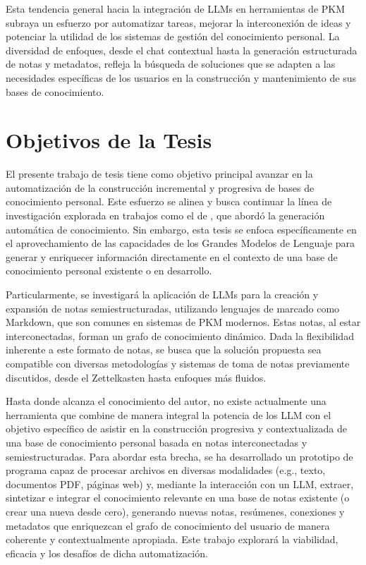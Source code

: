 Esta tendencia general hacia la integración de LLMs en herramientas de PKM subraya un esfuerzo por automatizar tareas, mejorar la interconexión de ideas y potenciar la utilidad de los sistemas de gestión del conocimiento personal. La diversidad de enfoques, desde el chat contextual hasta la generación estructurada de notas y metadatos, refleja la búsqueda de soluciones que se adapten a las necesidades específicas de los usuarios en la construcción y mantenimiento de sus bases de conocimiento.

\section{Objetivos de la Tesis}
\label{sec:objetivos}
El presente trabajo de tesis tiene como objetivo principal avanzar en la automatización de la construcción incremental y progresiva de bases de conocimiento personal. Este esfuerzo se alinea y busca continuar la línea de investigación explorada en trabajos como el de \cite{fragaAutomaticGenerationKnowledge2023}, que abordó la generación automática de conocimiento. Sin embargo, esta tesis se enfoca específicamente en el aprovechamiento de las capacidades de los Grandes Modelos de Lenguaje para generar y enriquecer información directamente en el contexto de una base de conocimiento personal existente o en desarrollo.

Particularmente, se investigará la aplicación de LLMs para la creación y expansión de notas semiestructuradas, utilizando lenguajes de marcado como Markdown, que son comunes en sistemas de PKM modernos. Estas notas, al estar interconectadas, forman un grafo de conocimiento dinámico. Dada la flexibilidad inherente a este formato de notas, se busca que la solución propuesta sea compatible con diversas metodologías y sistemas de toma de notas previamente discutidos, desde el Zettelkasten hasta enfoques más fluidos.

Hasta donde alcanza el conocimiento del autor, no existe actualmente una herramienta que combine de manera integral la potencia de los LLM con el objetivo específico de asistir en la construcción progresiva y contextualizada de una base de conocimiento personal basada en notas interconectadas y semiestructuradas. Para abordar esta brecha, se ha desarrollado un prototipo de programa capaz de procesar archivos en diversas modalidades (e.g., texto, documentos PDF, páginas web) y, mediante la interacción con un LLM, extraer, sintetizar e integrar el conocimiento relevante en una base de notas existente (o crear una nueva desde cero), generando nuevas notas, resúmenes, conexiones y metadatos que enriquezcan el grafo de conocimiento del usuario de manera coherente y contextualmente apropiada. Este trabajo explorará la viabilidad, eficacia y los desafíos de dicha automatización.